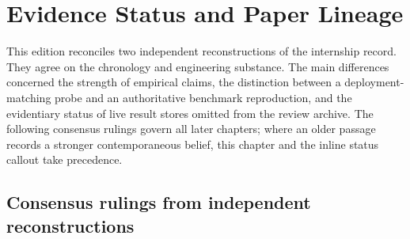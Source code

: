 \documentclass[11pt]{report}
\begin{document}
\tableofcontents
\chapter{Evidence Status and Paper Lineage}
\label{chap:collaborative-validation}

This edition reconciles two independent reconstructions of the internship record.
They agree on the chronology and engineering substance. The main differences
concerned the strength of empirical claims, the distinction between a
deployment-matching probe and an authoritative benchmark reproduction, and the
evidentiary status of live result stores omitted from the review archive. The
following consensus rulings govern all later chapters; where an older passage
records a stronger contemporaneous belief, this chapter and the inline status
callout take precedence.

\section{Consensus rulings from independent reconstructions}
\end{document}
